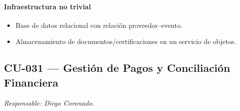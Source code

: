 \paragraph{Infraestructura no trivial}
\begin{itemize}[leftmargin=1.4em, topsep=1pt]
  \item Base de datos relacional con relación proveedor–evento.
  \item Almacenamiento de documentos/certificaciones en un servicio de objetos.
\end{itemize}

\subsection{CU-031 --- Gestión de Pagos y Conciliación Financiera}
\label{cu:cu-031}
\textit{Responsable: Diego Coronado.}

